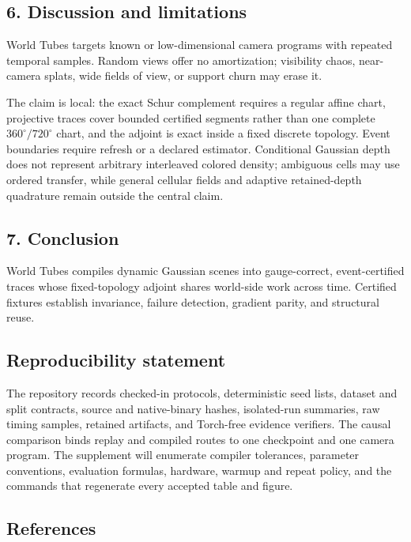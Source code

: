 \documentclass[
]{article}
\begin{document}
\subsection{6. Discussion and
limitations}\label{discussion-and-limitations}

World Tubes targets known or low-dimensional camera programs with
repeated temporal samples. Random views offer no amortization;
visibility chaos, near-camera splats, wide fields of view, or support
churn may erase it.

The claim is local: the exact Schur complement requires a regular affine
chart, projective traces cover bounded certified segments rather than
one complete \(360^\circ/720^\circ\) chart, and the adjoint is exact
inside a fixed discrete topology. Event boundaries require refresh or a
declared estimator. Conditional Gaussian depth does not represent
arbitrary interleaved colored density; ambiguous cells may use ordered
transfer, while general cellular fields and adaptive retained-depth
quadrature remain outside the central claim.

\subsection{7. Conclusion}\label{conclusion}

World Tubes compiles dynamic Gaussian scenes into gauge-correct,
event-certified traces whose fixed-topology adjoint shares world-side
work across time. Certified fixtures establish invariance, failure
detection, gradient parity, and structural reuse.

\subsection{Reproducibility statement}\label{reproducibility-statement}

The repository records checked-in protocols, deterministic seed lists,
dataset and split contracts, source and native-binary hashes,
isolated-run summaries, raw timing samples, retained artifacts, and
Torch-free evidence verifiers. The causal comparison binds replay and
compiled routes to one checkpoint and one camera program. The supplement
will enumerate compiler tolerances, parameter conventions, evaluation
formulas, hardware, warmup and repeat policy, and the commands that
regenerate every accepted table and figure.

\subsection{References}\label{references}
\end{document}
